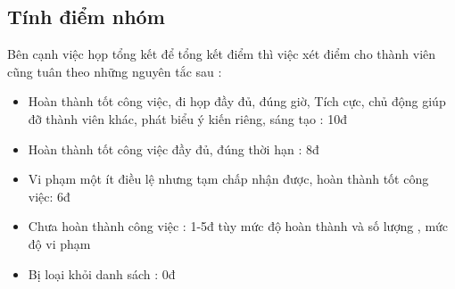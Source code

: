 \documentclass[12pt]{article}
\begin{document}
\begin{titlepage}
\section{Tính điểm nhóm}
Bên cạnh việc họp tổng kết để tổng kết điểm thì việc xét điểm cho thành viên cũng tuân theo những nguyên tắc sau :
\begin{itemize}
    \item Hoàn thành tốt công việc, đi họp đầy đủ, đúng giờ, Tích cực, chủ động giúp đỡ thành viên khác, phát biểu ý kiến riêng, sáng tạo : 10đ
    \item Hoàn thành tốt công việc đầy đủ, đúng thời hạn : 8đ
    \item Vi phạm một ít điều lệ nhưng tạm chấp nhận được, hoàn thành tốt công việc: 6đ
    \item Chưa hoàn thành công việc : 1-5đ tùy mức độ hoàn thành và số lượng , mức độ vi phạm
    \item Bị loại khỏi danh sách : 0đ
\end{itemize}



 \end{titlepage}
\end{document}
